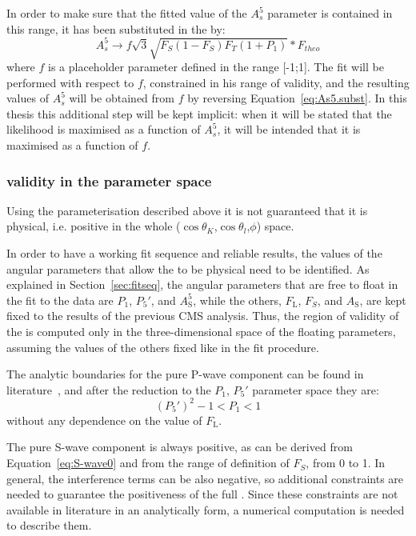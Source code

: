 In order to make sure that the fitted value of the $A_s^5$ parameter is contained in this range, it has been substituted in the \pdf by:
\begin{equation} \label{eq:As5.subst}
  A^5_s\to f\sqrt{3}\sqrt{F_S(1-F_S)F_T(1+P_1)}*F_{theo}
\end{equation}
where $f$ is a placeholder parameter defined in the range [-1;1].
The fit will be performed with respect to $f$, constrained in his range of validity, and the resulting values of $A_s^5$ will be obtained from $f$ by reversing Equation~\ref{eq:As5.subst}.
In this thesis this additional step will be kept implicit: when it will be stated that the likelihood is maximised as a function of $A_s^5$, it will be intended that it is maximised as a function of $f$.

\subsubsection{\pdf validity in the parameter space}
\label{sec:phys.bound}
Using the \pdf parameterisation described above it is not guaranteed that it is physical, i.e. positive in the whole ($\cos\theta_K$,$\cos\theta_l$,$\phi$) space.

In order to have a working fit sequence and reliable results, the values of the angular parameters that allow the \pdf to be physical need to be identified.
As explained in Section~\ref{sec:fitseq}, the angular parameters that are free to float in the fit to the data are $P_1$, $P_5'$, and $A^5_\mathrm{S}$, while the others, $F_\mathrm{L}$, $F_S$, and $A_\mathrm{S}$, are kept fixed to the results of the previous CMS analysis.
Thus, the region of validity of the \pdf is computed only in the three-dimensional space of the floating parameters, assuming the values of the others fixed like in the fit procedure.

The analytic boundaries for the pure P-wave component can be found in literature~\cite{Matias:2014jua}, and after the reduction to the $P_1$, $P_5'$ parameter space they are:
\begin{equation} \label{eq:anal.bound}
  (P_5')^2 - 1 < P_1 < 1
\end{equation}
without any dependence on the value of $F_\mathrm{L}$.

The pure S-wave component is always positive, as can be derived from Equation~\ref{eq:S-wave0} and from the range of definition of $F_S$, from 0 to 1.
In general, the interference terms can be also negative, so additional constraints are needed to guarantee the positiveness of the full \pdf.
Since these constraints are not available in literature in an analytically form, a numerical computation is needed to describe them.

